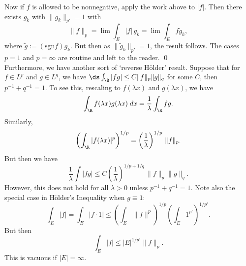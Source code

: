 Now if $f$ is allowed to be nonnegative, apply the work above to $|f|$. Then there exists $g_k$ with $\|g_k\|_{p'}= 1$ with
	\[
	\|f\|_p = \lim \int_E |f| \, g_k = \lim \int_E f \tilde{g}_k,
	\]
where $\tilde{g}:= (\text{sgn} f) g_k$. But then as $\|\tilde{g}_k\|_{p'}= 1$, the result follows. The cases $p=1$ and $p= \infty$ are routine and left to the reader. \qed \\


Furthermore, we have another sort of `reverse H\"older' result. Suppose that for $f \in L^p$ and $g \in L^q$, we have $\ds\int_\R |fg| \leq C \|f\|_p \|g\|_q$ for some $C$, then $p^{-1} + q^{-1}= 1$. To see this, rescaling to $f(\lambda x)$ and $g(\lambda x)$, we have
	\[
	\int_\R f(\lambda x) g(\lambda x) \; dx = \dfrac{1}{\lambda} \int_\R fg.
	\]
Similarly, 
	\[
	\left(\int_\R |f(\lambda x)|^p \right)^{1/p}= \left(\dfrac{1}{\lambda}\right)^{1/p} \, \|f\|_p.
	\]
But then we have
	\[
	\dfrac{1}{\lambda} \int |fg| \leq C \left( \dfrac{1}{\lambda} \right)^{1/p+1/q} \, \|f\|_p \|g\|_q.
	\]
However, this does not hold for all $\lambda>0$ unless $p^{-1} + q^{-1}= 1$. Note also the special case in H\"older's Inequality when $g \equiv 1$:
	\[
	\int_E |f| = \int_E |f \cdot 1| \leq \left( \int_E \|f\|^p \right)^{1/p} \left( \int_E 1^{p'} \right)^{1/p'}.
	\]
 But then 
 	\[
	\int_E |f| \leq |E|^{1/p'} \|f\|_p.
	\]
 This is vacuous if $|E|= \infty$. 


